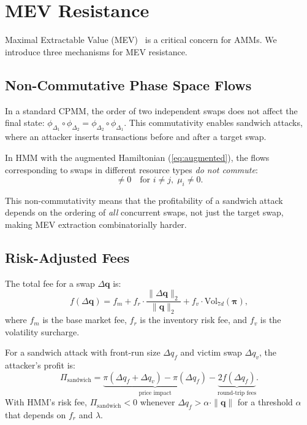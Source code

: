 \section{MEV Resistance}

\label{sec:mev}

Maximal Extractable Value (MEV)~\cite{daian2020flash} is a critical concern for AMMs. We introduce three mechanisms for MEV resistance.

\subsection{Non-Commutative Phase Space Flows}

In a standard CPMM, the order of two independent swaps does not affect the final state: $\phi_{\Delta_1} \circ \phi_{\Delta_2} = \phi_{\Delta_2} \circ \phi_{\Delta_1}$. This commutativity enables sandwich attacks, where an attacker inserts transactions before and after a target swap.

In HMM with the augmented Hamiltonian (\ref{eq:augmented}), the flows corresponding to swaps in different resource types \emph{do not commute}:
\begin{equation}
[\phi_{\Delta q_i}, \phi_{\Delta q_j}] \neq 0 \quad \text{for } i \neq j, \; \mu_i \neq 0.
\end{equation}

This non-commutativity means that the profitability of a sandwich attack depends on the ordering of \emph{all} concurrent swaps, not just the target swap, making MEV extraction combinatorially harder.

\subsection{Risk-Adjusted Fees}

The total fee for a swap $\Delta\bm{q}$ is:
\begin{equation}
f(\Delta\bm{q}) = f_m + f_r \cdot \frac{\|\Delta\bm{q}\|_2}{\|\bm{q}\|_2} + f_v \cdot \text{Vol}_{7d}(\bm{\pi}),
\end{equation}
where $f_m$ is the base market fee, $f_r$ is the inventory risk fee, and $f_v$ is the volatility surcharge.

\begin{proposition}
For a sandwich attack with front-run size $\Delta q_f$ and victim swap $\Delta q_v$, the attacker's profit is:
\begin{equation}
\Pi_{\text{sandwich}} = \underbrace{\pi(\Delta q_f + \Delta q_v) - \pi(\Delta q_f)}_{\text{price impact}} - \underbrace{2f(\Delta q_f)}_{\text{round-trip fees}}.
\end{equation}
With HMM's risk fee, $\Pi_{\text{sandwich}} < 0$ whenever $\Delta q_f > \alpha \cdot \|\bm{q}\|$ for a threshold $\alpha$ that depends on $f_r$ and $\lambda$.
\end{proposition}

